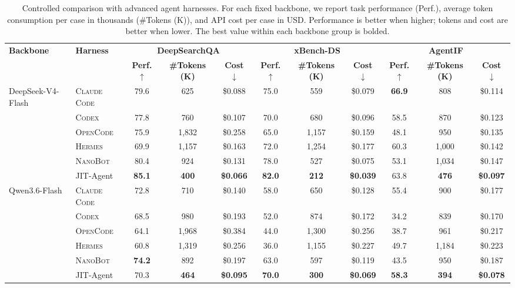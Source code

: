 \documentclass{article}
\newcommand{\ourmethod}{JIT-Agent\xspace}
\begin{document}
\begin{table}[!t]
\centering
\small
\setlength{\tabcolsep}{2.2pt}
\renewcommand{\arraystretch}{1.08}
\caption{Controlled comparison with advanced agent harnesses. For each fixed backbone, we report task performance (Perf.), average token consumption per case in thousands (\#Tokens (K)), and API cost per case in USD. Performance is better when higher; tokens and cost are better when lower. The best value within each backbone group is bolded.}
\label{tab:advanced_harness_comparison}
\begin{adjustbox}{max width=\textwidth}
\begin{tabular}{llccccccccc}
\toprule
\textbf{Backbone} & \textbf{Harness} & \multicolumn{3}{c}{\textbf{DeepSearchQA}} & \multicolumn{3}{c}{\textbf{xBench-DS}} & \multicolumn{3}{c}{\textbf{AgentIF}} \\
\cmidrule(lr){3-5}\cmidrule(lr){6-8}\cmidrule(lr){9-11}
 & & \textbf{Perf. $\uparrow$} & \textbf{\#Tokens (K)} & \textbf{Cost $\downarrow$} & \textbf{Perf. $\uparrow$} & \textbf{\#Tokens (K)} & \textbf{Cost $\downarrow$} & \textbf{Perf. $\uparrow$} & \textbf{\#Tokens (K)} & \textbf{Cost $\downarrow$} \\
\midrule
\multirow{6}{*}{DeepSeek-V4-Flash} & \textsc{Claude Code} & 79.6 & 625 & \$0.088 & 75.0 & 559 & \$0.079 & \textbf{66.9} & 808 & \$0.114 \\
 & \textsc{Codex} & 77.8 & 760 & \$0.107 & 70.0 & 680 & \$0.096 & 58.5 & 870 & \$0.123 \\
 & \textsc{OpenCode} & 75.9 & 1,832 & \$0.258 & 65.0 & 1,157 & \$0.159 & 48.1 & 950 & \$0.135 \\
 & \textsc{Hermes} & 69.9 & 1,157 & \$0.163 & 72.0 & 1,254 & \$0.177 & 60.3 & 1,000 & \$0.142 \\
 & \textsc{NanoBot} & 80.4 & 924 & \$0.131 & 78.0 & 527 & \$0.075 & 53.1 & 1,034 & \$0.147 \\
 & \ourmethod & \textbf{85.1} & \textbf{400} & \textbf{\$0.066} & \textbf{82.0} & \textbf{212} & \textbf{\$0.039} & 63.8 & \textbf{476} & \textbf{\$0.097} \\
\midrule
\multirow{6}{*}{Qwen3.6-Flash} & \textsc{Claude Code} & 72.8 & 710 & \$0.140 & 58.0 & 650 & \$0.128 & 55.4 & 900 & \$0.177 \\
 & \textsc{Codex} & 68.5 & 980 & \$0.193 & 52.0 & 874 & \$0.172 & 34.2 & 839 & \$0.170 \\
 & \textsc{OpenCode} & 64.1 & 1,968 & \$0.384 & 44.0 & 1,300 & \$0.256 & 38.7 & 961 & \$0.217 \\
 & \textsc{Hermes} & 60.8 & 1,319 & \$0.256 & 36.0 & 1,155 & \$0.227 & 49.7 & 1,184 & \$0.223 \\
 & \textsc{NanoBot} & \textbf{74.2} & 892 & \$0.197 & 63.0 & 597 & \$0.119 & 43.5 & 950 & \$0.187 \\
 & \ourmethod & 70.3 & \textbf{464} & \textbf{\$0.095} & \textbf{70.0} & \textbf{300} & \textbf{\$0.069} & \textbf{58.3} & \textbf{394} & \textbf{\$0.078} \\
\bottomrule
\end{tabular}
\end{adjustbox}
\end{table}
\end{document}
